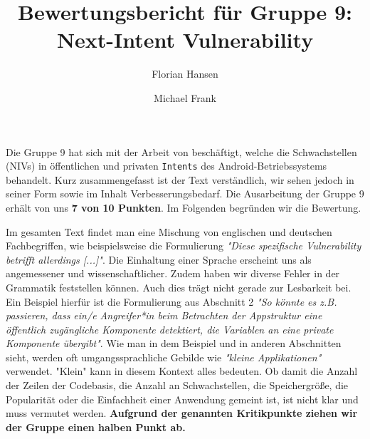 \documentclass{article}
\author{Florian Hansen \and Michael Frank}
\title{Bewertungsbericht für Gruppe 9: Next-Intent Vulnerability}
\begin{document}
  \maketitle

  Die Gruppe 9 hat sich mit der Arbeit von \cite{niv} beschäftigt, welche die
  Schwachstellen (NIVs) in öffentlichen und privaten \texttt{Intents} des
  Android-Betriebssystems behandelt. Kurz zusammengefasst ist der Text
  verständlich, wir sehen jedoch in seiner Form sowie im Inhalt
  Verbesserungsbedarf. Die Ausarbeitung der Gruppe 9 erhält von uns 
  \textbf{7 von 10 Punkten}. Im Folgenden begründen wir die Bewertung.

  Im gesamten Text findet man eine Mischung von englischen und deutschen
  Fachbegriffen, wie beispielsweise die Formulierung \textit{"Diese spezifische
  Vulnerability betrifft allerdings [...]"}. Die Einhaltung einer Sprache
  erscheint uns als angemessener und wissenschaftlicher. Zudem haben wir
  diverse Fehler in der Grammatik feststellen können. Auch dies trägt nicht
  gerade zur Lesbarkeit bei. Ein Beispiel hierfür ist die Formulierung aus
  Abschnitt 2 \textit{"So könnte es z.B. passieren, dass ein/e Angreifer*in beim
  Betrachten der Appstruktur eine öffentlich zugängliche Komponente
  detektiert, die Variablen an eine private Komponente übergibt"}. Wie man in
  dem Beispiel und in anderen Abschnitten sieht, werden oft umgangssprachliche
  Gebilde wie \textit{"kleine Applikationen"} verwendet. "Klein" kann in
  diesem Kontext alles bedeuten. Ob damit die Anzahl der Zeilen der Codebasis,
  die Anzahl an Schwachstellen, die Speichergröße, die Popularität oder
  die Einfachheit einer Anwendung gemeint ist, ist nicht klar und muss vermutet
  werden. \textbf{Aufgrund der genannten Kritikpunkte ziehen wir der Gruppe einen 
halben Punkt ab.}
\end{document}

